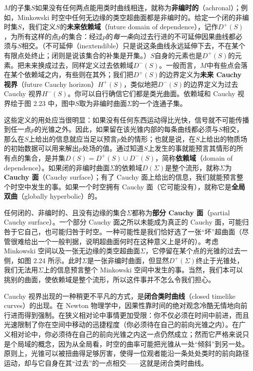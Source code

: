 $M$的子集$S$如果没有任何两点能用类时曲线相连，就称为\textbf{非编时的}（achronal）；例如，Minkowski 时空中任何无边缘的类空超曲面都是非编时的。给定一个闭的非编时集$S$，我们定义$S$的\textbf{未来依赖域}（future domain of dependence），记作$D^+(S)$，为所有这样的点$p$的集合：经过$p$的\emph{每一条}向过去行进的不可延伸因果曲线都必须与$S$相交。（不可延伸（inextendible）只是说这条曲线永远延伸下去，不在某个有限点处终止；闭则是说该集合的补集是开集。）$S$自身的元素也是$D^+(S)$的元素。把未来换成过去，同样定义过去依赖域$D^-(S)$。一般而言，$M$中有些点会落在某个依赖域之内，有些则在其外；我们把$D^+(S)$的边界定义为\textbf{未来 Cauchy 视界}（future Cauchy horizon）$H^+(S)$，类似地把$D^-(S)$的边界定义为过去 Cauchy 视界$H^-(S)$。你可以自行确信它们都是类光曲面。依赖域和 Cauchy 视界绘于图 2.23 中，图中$S$取为非编时曲面$\Sigma$的一个连通子集。

这些定义的用处应当很明显：如果没有任何东西运动得比光快，信号就不可能传播到任一点$p$的光锥之外。因此，如果留在该光锥内部的每条曲线都必须与$S$相交，那么在$S$上给出的信息就应当足以预言$p$处的情形；也就是说，在$S$上给出的物质场的初始数据可以用来解出$p$处场的值。通过知道$S$上发生的事就能预言其情形的所有点的集合，是并集$D(S)=D^+(S)\cup D^-(S)$，简称\textbf{依赖域}（domain of dependence）。如果闭的非编时曲面$\Sigma$的依赖域$D(\Sigma)$是整个流形，就称$\Sigma$为\textbf{Cauchy 面}（Cauchy surface）；有了 Cauchy 面上给出的信息，我们就能预言整个时空中发生的事。如果一个时空拥有 Cauchy 面（它可能没有），就称它是\textbf{全局双曲}（globally hyperbolic）的。

任何闭的、非编时的、且没有边缘的集合$\Sigma$都称为\textbf{部分 Cauchy 面}（partial Cauchy surface）。一个部分 Cauchy 面之所以未能成为真正的 Cauchy 面，可能归咎于它自己，也可能归咎于时空。一种可能性是我们恰好选了一张“坏”超曲面（尽管很难给出一个一般判据，说明超曲面何时在这种意义上是坏的）。考虑 Minkowski 空间以及一张无边缘的类空超曲面$\Sigma$，它停留在某个点的光锥的过去一侧，如图 2.24 所示。此时$\Sigma$是一张非编时曲面，但显然$D^+(\Sigma)$终止于光锥处，我们无法用$\Sigma$上的信息预言整个 Minkowski 空间中发生的事。当然，我们本可以挑别的曲面，使依赖域是整个流形，所以这件事并不怎么令我们担心。

Cauchy 视界出现的一种稍更不平凡的方式，是\textbf{闭合类时曲线}（closed timelike curves）的出现。在 Newton 物理学中，因果性靠时间的绝对观念冷酷无情地向前行进而得到强制。在狭义相对论中事情更加受限：你不仅必须在时间中前进，而且光速限制了你在空间中移动的迅捷程度（你必须待在自己的前向光锥之内）。在广义相对论中，你必须待在自己的前向光锥之内这一点仍然成立；然而它严格来说只是个局域的概念，因为从全局看，时空的曲率可能把光锥从一处“倾斜”到另一处。原则上，光锥可以被扭曲得足够厉害，使得一位观者能沿一条处处类时的前向路径运动，却与它自身在其“过去”的一点相交——这就是闭合类时曲线。

